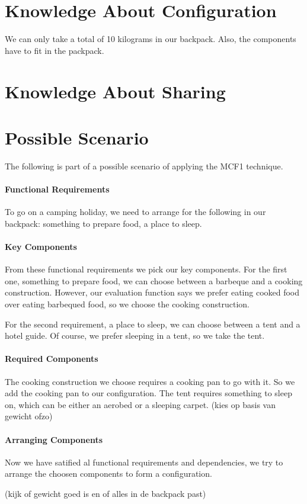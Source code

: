 \documentclass[a4paper,11pt]{article}
\begin{document}
\section*{Knowledge About Configuration}

We can only take a total of 10 kilograms in our backpack.
Also, the components have to fit in the packpack.


\section*{Knowledge About Sharing}


\section*{Possible Scenario}

The following is part of a possible scenario of applying the
MCF1 technique.

\paragraph{Functional Requirements}

To go on a camping holiday, we need to arrange for the following
in our backpack: something to prepare food, a place to sleep.

\paragraph{Key Components}

From these functional requirements we pick our key components. For
the first one, something to prepare food, we can choose between a
barbeque and a cooking construction. However, our evaluation
function says we prefer eating cooked food over eating barbequed
food, so we choose the cooking construction.

For the second requirement, a place to sleep, we can choose between
a tent and a hotel guide. Of course, we prefer sleeping in a tent,
so we take the tent.

\paragraph{Required Components}

The cooking construction we choose requires a cooking pan to go
with it. So we add the cooking pan to our configuration. The tent
requires something to sleep on, which can be either an aerobed or
a sleeping carpet. (kies op basis van gewicht ofzo)

\paragraph{Arranging Components}

Now we have satified al functional requirements and dependencies,
we try to arrange the choosen components to form a configuration.

(kijk of gewicht goed is en of alles in de backpack past)
\end{document}
